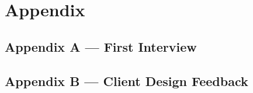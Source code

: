 \documentclass[advisory-ia.tex]{subfiles}
\begin{document}
\section{Appendix}
\subsection{Appendix A --- First Interview}
\label{appendix:a}


\newpage
\subsection{Appendix B --- Client Design Feedback}
\label{appendix:b}

\end{document}
